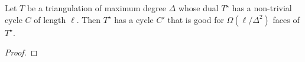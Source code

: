 \documentclass{patmorin}
\newcommand{\dual}[1]{{#1}^\star}
\begin{document}
\begin{thm}
  Let $T$ be a triangulation of maximum degree $\Delta$ whose dual
  $\dual{T}$ has a non-trivial cycle $C$ of length $\ell$.  Then
  $\dual{T}$ has a cycle $C'$ that is good for $\Omega(\ell/\Delta^2)$
  faces of $\dual{T}$.
\end{thm}


\begin{lem}

\end{lem}

\begin{proof}

\end{proof}



\section{}

\newpage


\end{document}
